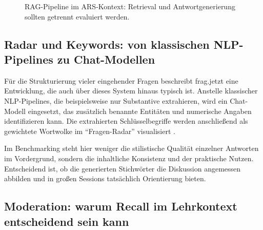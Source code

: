 \begin{figure}[t]
\centering
{}
\caption{RAG-Pipeline im ARS-Kontext: Retrieval und Antwortgenerierung sollten getrennt evaluiert werden.}
\label{fig:rag}
\end{figure}

\subsection{Radar und Keywords: von klassischen NLP-Pipelines zu Chat-Modellen}

Für die Strukturierung vieler eingehender Fragen beschreibt frag.jetzt eine Entwicklung, die auch über dieses System hinaus typisch ist. Anstelle klassischer NLP-Pipelines, die beispielsweise nur Substantive extrahieren, wird ein Chat-Modell eingesetzt, das zusätzlich benannte Entitäten und numerische Angaben identifizieren kann. Die extrahierten Schlüsselbegriffe werden anschließend als gewichtete Wortwolke im \enquote{Fragen-Radar} visualisiert \parencite{fragjetzt-analyse,educa-fragjetzt,topiccloud-pdf}. 

Im Benchmarking steht hier weniger die stilistische Qualität einzelner Antworten im Vordergrund, sondern die inhaltliche Konsistenz und der praktische Nutzen. Entscheidend ist, ob die generierten Stichwörter die Diskussion angemessen abbilden und in großen Sessions tatsächlich Orientierung bieten.

\subsection{Moderation: warum Recall im Lehrkontext entscheidend sein kann}

